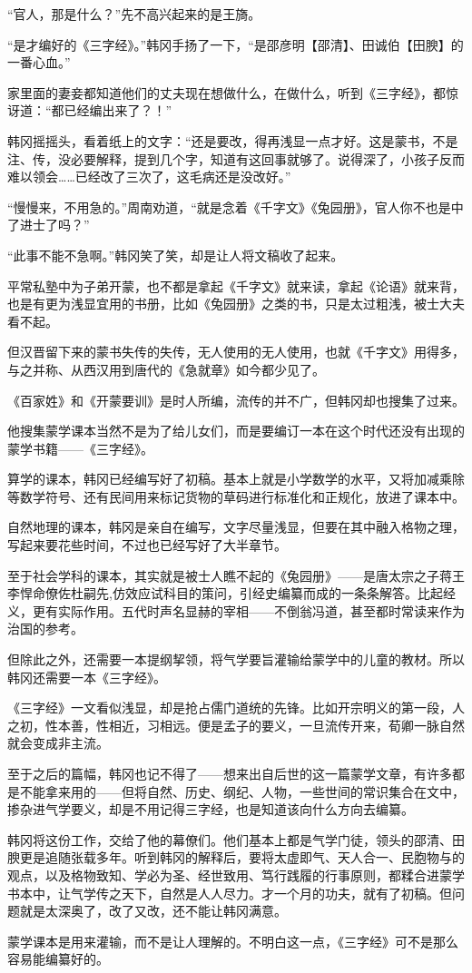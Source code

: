 “官人，那是什么？”先不高兴起来的是王旖。

“是才编好的《三字经》。”韩冈手扬了一下，“是邵彦明【邵清】、田诚伯【田腴】的一番心血。”

家里面的妻妾都知道他们的丈夫现在想做什么，在做什么，听到《三字经》，都惊讶道：“都已经编出来了？！”

韩冈摇摇头，看着纸上的文字：“还是要改，得再浅显一点才好。这是蒙书，不是注、传，没必要解释，提到几个字，知道有这回事就够了。说得深了，小孩子反而难以领会……已经改了三次了，这毛病还是没改好。”

“慢慢来，不用急的。”周南劝道，“就是念着《千字文》《兔园册》，官人你不也是中了进士了吗？”

“此事不能不急啊。”韩冈笑了笑，却是让人将文稿收了起来。

平常私塾中为子弟开蒙，也不都是拿起《千字文》就来读，拿起《论语》就来背，也是有更为浅显宜用的书册，比如《兔园册》之类的书，只是太过粗浅，被士大夫看不起。

但汉晋留下来的蒙书失传的失传，无人使用的无人使用，也就《千字文》用得多，与之并称、从西汉用到唐代的《急就章》如今都少见了。

《百家姓》和《开蒙要训》是时人所编，流传的并不广，但韩冈却也搜集了过来。

他搜集蒙学课本当然不是为了给儿女们，而是要编订一本在这个时代还没有出现的蒙学书籍——《三字经》。

算学的课本，韩冈已经编写好了初稿。基本上就是小学数学的水平，又将加减乘除等数学符号、还有民间用来标记货物的草码进行标准化和正规化，放进了课本中。

自然地理的课本，韩冈是亲自在编写，文字尽量浅显，但要在其中融入格物之理，写起来要花些时间，不过也已经写好了大半章节。

至于社会学科的课本，其实就是被士人瞧不起的《兔园册》——是唐太宗之子蒋王李悍命僚佐杜嗣先,仿效应试科目的策问，引经史编纂而成的一条条解答。比起经义，更有实际作用。五代时声名显赫的宰相——不倒翁冯道，甚至都时常读来作为治国的参考。

但除此之外，还需要一本提纲挈领，将气学要旨灌输给蒙学中的儿童的教材。所以韩冈还需要一本《三字经》。

《三字经》一文看似浅显，却是抢占儒门道统的先锋。比如开宗明义的第一段，人之初，性本善，性相近，习相远。便是孟子的要义，一旦流传开来，荀卿一脉自然就会变成非主流。

至于之后的篇幅，韩冈也记不得了——想来出自后世的这一篇蒙学文章，有许多都是不能拿来用的——但将自然、历史、纲纪、人物，一些世间的常识集合在文中，掺杂进气学要义，却是不用记得三字经，也是知道该向什么方向去编纂。

韩冈将这份工作，交给了他的幕僚们。他们基本上都是气学门徒，领头的邵清、田腴更是追随张载多年。听到韩冈的解释后，要将太虚即气、天人合一、民胞物与的观点，以及格物致知、学必为圣、经世致用、笃行践履的行事原则，都糅合进蒙学书本中，让气学传之天下，自然是人人尽力。才一个月的功夫，就有了初稿。但问题就是太深奥了，改了又改，还不能让韩冈满意。

蒙学课本是用来灌输，而不是让人理解的。不明白这一点，《三字经》可不是那么容易能编纂好的。

